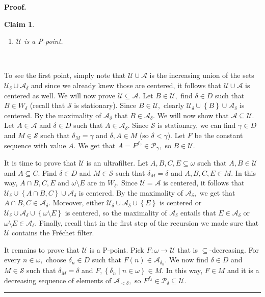 \documentclass{article}%
\newtheorem{claim}[theorem]{Claim}
\newenvironment{proof}[1][Proof]{\noindent\textbf{#1.} }{\ \rule{0.5em}{0.5em}}
\begin{document}
\begin{proof}
\begin{claim}
\begin{enumerate}
\item $\mathcal{U}$ is a \textsf{P}-point.
\end{enumerate}
\end{claim}

\qquad\ \ \ 

To see the first point, simply note that $\mathcal{U\cup A}$ is the increasing
union of the sets $\mathcal{U}_{\delta}\cup\mathcal{A}_{\delta}$ and since we
already knew those are centered, it follows that $\mathcal{U\cup A}$ is
centered as well. We will now prove $\mathcal{U\subseteq A}.$ Let
$B\in\mathcal{U},$ find $\delta\in D$ such that $B\in W_{\delta}$ (recall that
$\mathcal{S}$ is stationary). Since $B\in\mathcal{U},$ clearly $\mathcal{U}%
_{\delta}\cup\left\{  B\right\}  \cup\mathcal{A}_{\delta}$ is centered$.$ By
the maximality of $\mathcal{A}_{\delta}$ that $B\in\mathcal{A}_{\delta}.$ We
will now show that $\mathcal{A\subseteq U}.$ Let $A\in\mathcal{A}$ and
$\delta\in D$ such that $A\in\mathcal{A}_{\delta}.$ Since $\mathcal{S}$ is
stationary, we can find $\gamma\in D$ and $M\in\mathcal{S}$ such that
$\delta_{M}=\gamma$ and $\delta,A\in M$ (so $\delta<\gamma$). Let $F$ be the
constant sequence with value $A.$ We get that $A=F^{f_{\gamma}}\in
\mathcal{P}_{\gamma},$ so $B\in\mathcal{U}.$

\qquad\qquad\qquad\qquad

It is time to prove that $\mathcal{U}$ is an ultrafilter. Let
$A,B,C,E\subseteq\omega$ such that $A,B\in\mathcal{U}$ and $A\subseteq C.$
Find $\delta\in D$ and $M\in\mathcal{S}$ such that $\delta_{M}=\delta$ and
$A,B,C,E\in M.$ In this way, $A\cap B,C,E$ and $\omega\setminus E$ are in
$W_{\delta}.$ Since $\mathcal{U=A}$ is centered, it follows that
$\mathcal{U}_{\delta}\cup\left\{  A\cap B,C\right\}  \cup\mathcal{A}_{\delta}$
is centered. By the maximality of $\mathcal{A}_{\delta},$ we get that $A\cap
B,C\in\mathcal{A}_{\delta}.$ Moreover, either $\mathcal{U}_{\delta}%
\cup\mathcal{A}_{\delta}\cup\left\{  E\right\}  $ is centered or
$\mathcal{U}_{\delta}\cup\mathcal{A}_{\delta}\cup\left\{  \omega\setminus
E\right\}  $ is centered, so the maximality of $\mathcal{A}_{\delta}$ entails
that $E\in\mathcal{A}_{\delta}$ or $\omega\setminus E\in\mathcal{A}_{\delta}.$
Finally, recall that in the first step of the recursion we made sure that
$\mathcal{U}$ contains the Fr\'{e}chet filter.

\qquad\qquad\qquad

It remains to prove that $\mathcal{U}$ is a \textsf{P}-point. Pick
$F:\omega\longrightarrow\mathcal{U}$ that is $\subseteq$-decreasing$.$ For
every $n\in\omega,$ choose $\delta_{n}\in D$ such that $F\left(  n\right)
\in\mathcal{A}_{\delta_{n}}.$ We now find $\delta\in D$ and $M\in\mathcal{S}$
such that $\delta_{M}=\delta$ and $F,\left\{  \delta_{n}\mid n\in
\omega\right\}  \in M.$ In this way, $F\in M$ and it is a decreasing sequence
of elements of $\mathcal{A}_{<\delta},$ so $F^{f_{\delta}}\in\mathcal{P}%
_{\delta}\subseteq\mathcal{U}.$
\end{proof}
\end{document}
